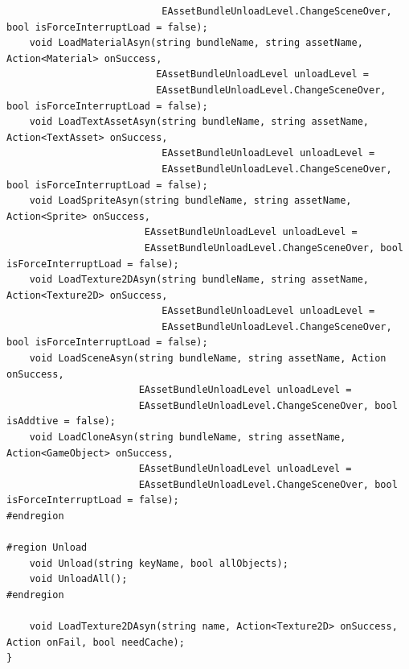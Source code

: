 \documentclass[9pt, b5paper]{article}
\begin{document}
\begin{verbatim}
                           EAssetBundleUnloadLevel.ChangeSceneOver, bool isForceInterruptLoad = false);
    void LoadMaterialAsyn(string bundleName, string assetName, Action<Material> onSuccess, 
                          EAssetBundleUnloadLevel unloadLevel = 
                          EAssetBundleUnloadLevel.ChangeSceneOver, bool isForceInterruptLoad = false);
    void LoadTextAssetAsyn(string bundleName, string assetName, Action<TextAsset> onSuccess, 
                           EAssetBundleUnloadLevel unloadLevel = 
                           EAssetBundleUnloadLevel.ChangeSceneOver, bool isForceInterruptLoad = false);
    void LoadSpriteAsyn(string bundleName, string assetName, Action<Sprite> onSuccess, 
                        EAssetBundleUnloadLevel unloadLevel = 
                        EAssetBundleUnloadLevel.ChangeSceneOver, bool isForceInterruptLoad = false);
    void LoadTexture2DAsyn(string bundleName, string assetName, Action<Texture2D> onSuccess, 
                           EAssetBundleUnloadLevel unloadLevel = 
                           EAssetBundleUnloadLevel.ChangeSceneOver, bool isForceInterruptLoad = false);
    void LoadSceneAsyn(string bundleName, string assetName, Action onSuccess, 
                       EAssetBundleUnloadLevel unloadLevel = 
                       EAssetBundleUnloadLevel.ChangeSceneOver, bool isAddtive = false);
    void LoadCloneAsyn(string bundleName, string assetName, Action<GameObject> onSuccess, 
                       EAssetBundleUnloadLevel unloadLevel = 
                       EAssetBundleUnloadLevel.ChangeSceneOver, bool isForceInterruptLoad = false);
#endregion
    
#region Unload
    void Unload(string keyName, bool allObjects);
    void UnloadAll();
#endregion

    void LoadTexture2DAsyn(string name, Action<Texture2D> onSuccess, Action onFail, bool needCache);
}
\end{verbatim}
\end{document}

